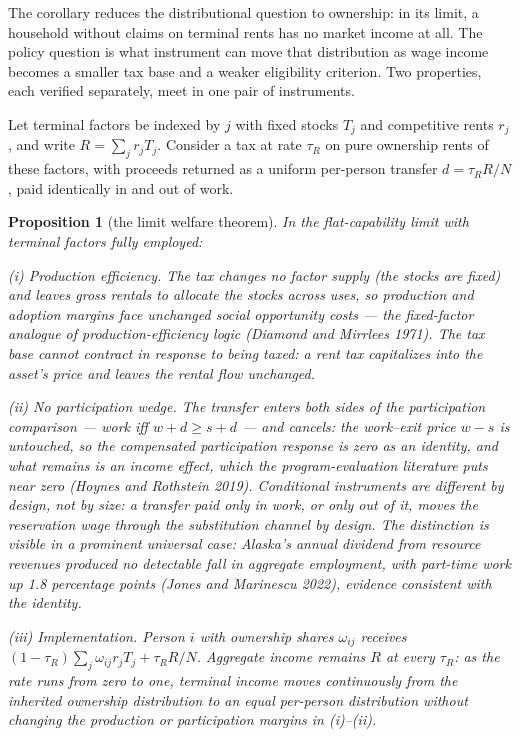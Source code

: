\documentclass[12pt]{article}
\theoremstyle{plain}
\newtheorem{proposition}{Proposition}
\begin{document}
The corollary reduces the distributional question to ownership: in its limit, a household without claims on terminal rents has no market income at all. The policy question is what instrument can move that distribution as wage income becomes a smaller tax base and a weaker eligibility criterion. Two properties, each verified separately, meet in one pair of instruments.

Let terminal factors be indexed by $j$ with fixed stocks $T_j$ and competitive rents $r_j$, and write $R = \sum _j r_j T_j$. Consider a tax at rate $\tau _R$ on pure ownership rents of these factors, with proceeds returned as a uniform per-person transfer $d = \tau _R R/N$, paid identically in and out of work.

\begin{proposition}[the limit welfare theorem]\label{prop:welfare}
In the flat-capability limit with terminal factors fully employed:

(i) \emph{Production efficiency.} The tax changes no factor supply (the stocks are fixed) and leaves gross rentals to allocate the stocks across uses, so production and adoption margins face unchanged social opportunity costs --- the fixed-factor analogue of production-efficiency logic (Diamond and Mirrlees 1971). The tax base cannot contract in response to being taxed: a rent tax capitalizes into the asset's price and leaves the rental flow unchanged.

(ii) \emph{No participation wedge.} The transfer enters both sides of the participation comparison --- work iff $w + d \ge s + d$ --- and cancels: the work--exit price $w - s$ is untouched, so the compensated participation response is zero as an identity, and what remains is an income effect, which the program-evaluation literature puts near zero (Hoynes and Rothstein 2019). Conditional instruments are different by design, not by size: a transfer paid only in work, or only out of it, moves the reservation wage through the substitution channel by design. The distinction is visible in a prominent universal case: Alaska's annual dividend from resource revenues produced no detectable fall in aggregate employment, with part-time work up 1.8 percentage points (Jones and Marinescu 2022), evidence consistent with the identity.

(iii) \emph{Implementation.} Person $i$ with ownership shares $\omega _{ij}$ receives $(1-\tau _R)\sum _j\omega _{ij}r_jT_j+\tau _RR/N$. Aggregate income remains $R$ at every $\tau _R$: as the rate runs from zero to one, terminal income moves continuously from the inherited ownership distribution to an equal per-person distribution without changing the production or participation margins in (i)--(ii).
\end{proposition}
\end{document}
